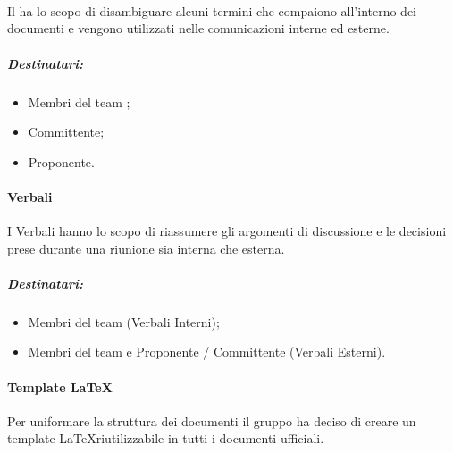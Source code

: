       \paragraph{\Glossario\\}
      Il \Glossario{}  ha lo scopo di disambiguare alcuni termini che compaiono all'interno dei documenti e vengono utilizzati nelle comunicazioni interne ed esterne.
      \subparagraph*{Destinatari:}
      \begin{itemize}
        \item Membri del team \Gruppo{};
        \item Committente;
        \item Proponente.
      \end{itemize}

      \paragraph{Verbali\\}
      I Verbali hanno lo scopo di riassumere gli argomenti di discussione e le decisioni prese durante una riunione sia interna che esterna.
      \subparagraph*{Destinatari:}
      \begin{itemize}
        \item Membri del team \Gruppo{} (Verbali Interni);
        \item Membri del team \Gruppo{} e Proponente / Committente (Verbali Esterni).
      \end{itemize}

      \paragraph{Template \LaTeX\\}
      Per uniformare la struttura dei documenti il gruppo ha deciso di creare un template \LaTeX riutilizzabile in tutti i documenti ufficiali.

